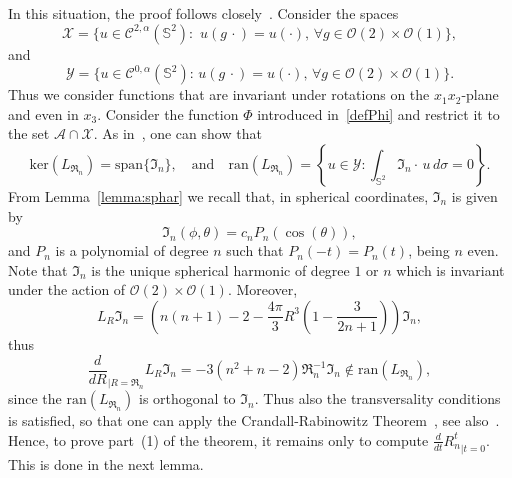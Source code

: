 \documentclass[10pt,reqno,english]{amsart}
\newcommand{\Sd}{\mathbb{S}^2}
\newcommand{\rn}{{\mathfrak R}_n  }
\theoremstyle{definition}
\numberwithin{equation}{section}
\begin{document}
In this situation, the proof follows closely~\cite{Fr19}. Consider the spaces
\[
\mathcal X=\{u\in\mathcal C^{2,\alpha}(\Sd):\,\,u(g\,\cdot)=u(\cdot),\,\forall g\in\mathcal O(2)\times \mathcal O(1)\},
\]
and
\[
\mathcal Y=\{u\in\mathcal C^{0,\alpha}(\Sd):\,u(g\,\cdot)=u(\cdot),\,\forall g\in\mathcal O(2)\times \mathcal O(1)\}.
\]
Thus we consider functions that are invariant under rotations on the $x_1x_2$-plane and even in $x_3$.
Consider the function $\Phi$ introduced in~\eqref{defPhi} and 
 restrict it to the set $\mathcal A\cap\mathcal X$. As in~\cite[Proposition 9]{Fr19}, one can  show that
\[
\mathrm{ker}( L_{\rn})=\mathrm{span}\{\mathfrak I_n\},\quad\text{and}\quad\mathrm{ran}(L_{\rn})=\left\{u\in\mathcal Y:\int_{\Sd}\mathfrak I_n\cdot\,u\,d\sigma=0\right\}.
\]
From Lemma~\ref{lemma:sphar} we recall that, in spherical coordinates, $\mathfrak I_n$ is given by
\[
\mathfrak I_n(\phi,\theta)=c_nP_n(\cos(\theta)),
\]
and $P_n$ is a polynomial of degree $n$ such that $P_n(-t)=P_n(t)$, being $n$ even.
Note that $\mathfrak I_n$ is the unique spherical harmonic of degree $1$ or $n$ which is invariant under the action of $\mathcal O(2)\times \mathcal O(1)$.
Moreover,
\[
L_{R}\mathfrak I_n=\left(n(n+1)-2-\frac{4\pi}{3}R^3\left(1-\frac{3}{2n+1}\right)\right)\mathfrak I_n,
\]
thus
\begin{equation}
\label{der-mixt1}
\frac{d}{dR}_{|R=\rn}L_R\mathfrak I_n=-3(n^2+n-2)\rn^{-1}\mathfrak I_n\not\in\mathrm{ran}(L_{\rn}),
\end{equation}
since the $\mathrm{ran}(L_{\rn})$ is orthogonal to $\mathfrak I_n$.
Thus also the transversality conditions is satisfied, so that one can apply the Crandall-Rabinowitz Theorem~\cite{CR73}, see also~\cite[Theorem I.5.1]{KieBook}. Hence, to prove part~(1) of the theorem, it remains only to compute $\frac{d}{dt}{R_n^t}_{|t=0}$. This is done in the next lemma.
\end{document}
